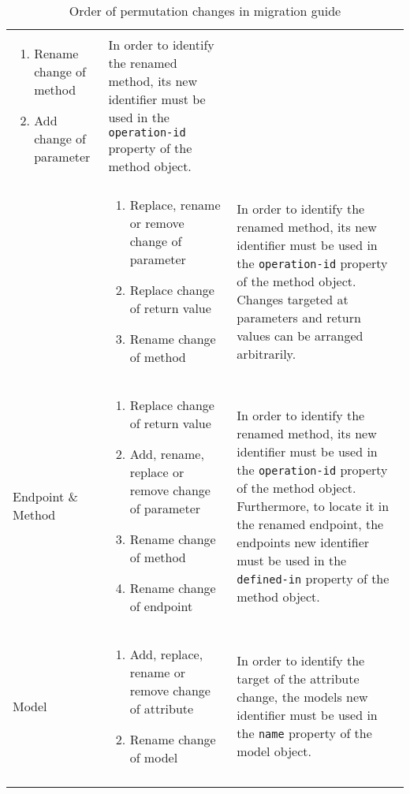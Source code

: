 \begin{longtable}{@{}p{}>{\raggedright\arraybackslash}p{}p{}@{}}
\begin{enumerate}[leftmargin=*]
		\item Rename change of method
		\item Add change of parameter
	\end{enumerate}           &     In order to identify the renamed method, its new identifier must be used in the \texttt{operation-id} property of the method object.      \\
&      \vspace{-2em}\begin{enumerate}[leftmargin=*]
	\setlength\itemsep{0.05em}
	\item Replace, rename or remove change of parameter
	\item Replace change of return value
	\item Rename change of method
\end{enumerate}           &     In order to identify the renamed method, its new identifier must be used in the \texttt{operation-id} property of the method object.  Changes targeted at parameters and return values can be arranged arbitrarily.   \\
		Endpoint \newline\& Method       &       \vspace{-2em}\begin{enumerate}[leftmargin=*]
			\setlength\itemsep{0.05em}
			\item Replace change of return value
			\item Add, rename, replace or remove change of parameter
			\item Rename change of method
			\item Rename change of endpoint
		\end{enumerate}           &     In order to identify the renamed method, its new identifier must be used in the \texttt{operation-id} property of the method object. Furthermore, to locate it in the renamed endpoint, the endpoints new identifier must be used in the \texttt{defined-in} property of the method object.  \\
		Model                    &         \vspace{-2em}\begin{enumerate}[leftmargin=*]
			\setlength\itemsep{0.05em}
			\item Add, replace, rename or remove change of attribute
			\item Rename change of model
		\end{enumerate}           &     In order to identify the target of the attribute change, the models new identifier must be used in the \texttt{name} property of the model object.      \\ \bottomrule
	\caption{Order of permutation changes in migration guide}
\label{tab:ChangeOrder}
	\end{longtable}

